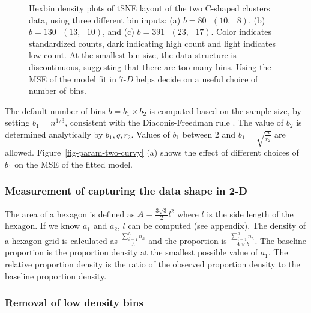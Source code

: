 \documentclass[
  12pt]{article}
\begin{document}
\begin{figure}[H]


\caption{\label{fig-bins-two-curvy}Hexbin density plots of tSNE layout
of the two C-shaped clusters data, using three different bin inputs: (a)
\(b = 80 \text{ } (10, \text{ }8)\), (b)
\(b = 130 \text{ } (13, \text{ }10)\), and (c)
\(b = 391 \text{ } (23, \text{ }17)\). Color indicates standardized
counts, dark indicating high count and light indicates low count. At the
smallest bin size, the data structure is discontinuous, suggesting that
there are too many bins. Using the MSE of the model fit in
\(7\text{-}D\) helps decide on a useful choice of number of bins.}

\end{figure}%

The default number of bins \(b=b_1\times b_2\) is computed based on the
sample size, by setting \(b_1=n^{1/3}\), consistent with the
Diaconis-Freedman rule \citep{freedman1981}. The value of \(b_2\) is
determined analytically by \(b_1, q, r_2\). Values of \(b_1\) between
\(2\) and \(b_1 = \sqrt{\frac{n}{r_2}}\) are allowed.
Figure~\ref{fig-param-two-curvy} (a) shows the effect of different
choices of \(b_1\) on the MSE of the fitted model.

\subsubsection{Measurement of capturing the data shape in
2-D}\label{measurement-of-capturing-the-data-shape-in-2-d}

The area of a hexagon is defined as \(A = \frac{3\sqrt{3}}{2}l^2\) where
\(l\) is the side length of the hexagon. If we know \(a_1\) and \(a_2\),
\(l\) can be computed (see appendix). The density of a hexagon grid is
calculated as \(\frac{\sum^{h}_{i=1}n_h}{A}\) and the proportion is
\(\frac{\sum^{h}_{i=1}n_h}{A \times b}\). The baseline proportion is the
proportion density at the smallest possible value of \(a_1\). The
relative proportion density is the ratio of the observed proportion
density to the baseline proportion density.

\subsubsection{Removal of low density
bins}\label{removal-of-low-density-bins}
\end{document}
